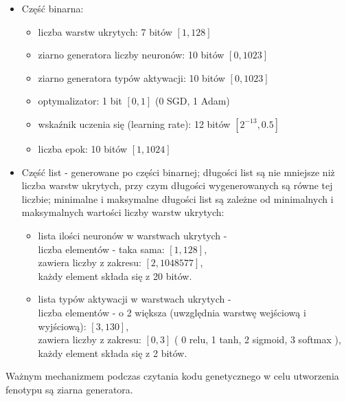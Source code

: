 \begin{itemize}
  \setlength{\itemsep}{0pt}
  \setlength{\parskip}{0pt}
  \item Część binarna:
    \begin{itemize}
      \setlength{\itemsep}{0pt}
      \setlength{\parskip}{0pt}
      \item liczba warstw ukrytych: 7 bitów $\left[1, 128\right]$
      \item ziarno generatora liczby neuronów: 10 bitów $\left[0, 1023\right]$
      \item ziarno generatora typów aktywacji: 10 bitów $\left[0, 1023\right]$
      \item optymalizator: 1 bit $\left[0, 1\right]$ (0 \textrightarrow SGD, 1 \textrightarrow Adam)
      \item wskaźnik uczenia się (learning rate): 12 bitów $\left[2^{-13}, 0.5\right]$
      \item liczba epok: 10 bitów $\left[1, 1024\right]$
    \end{itemize}
  \item Część list - generowane po części binarnej;
    długości list są nie mniejsze niż liczba warstw ukrytych,
    przy czym długości wygenerowanych są równe tej liczbie;
    minimalne i maksymalne długości list są zależne
    od minimalnych i maksymalnych wartości liczby warstw ukrytych:
    \begin{itemize}
      \setlength{\itemsep}{0pt}
      \setlength{\parskip}{0pt}
      \item lista ilości neuronów w warstwach ukrytych -\\
        \hspace*{1em}liczba elementów - taka sama:
          $\left[1, 128\right]$,\\
        \hspace*{1em}zawiera liczby z zakresu:
          $\left[2, 1 048 577\right]$,\\
        \hspace*{1em}każdy element składa się z 20 bitów.
      \item lista typów aktywacji w warstwach ukrytych -\\
        \hspace*{1em}liczba elementów - o 2 większa
          (uwzględnia warstwę wejściową i wyjściową):
          $\left[3, 130\right]$,\\
        \hspace*{1em}zawiera liczby z zakresu:
          $\left[0, 3\right]$
          (%
            0 \textrightarrow relu,
            1 \textrightarrow tanh,
            2 \textrightarrow sigmoid,
            3 \textrightarrow softmax%
          ),\\
        \hspace*{1em}każdy element składa się z 2 bitów.
    \end{itemize}
\end{itemize}
Ważnym mechanizmem podczas czytania kodu genetycznego
w celu utworzenia fenotypu są ziarna generatora.

